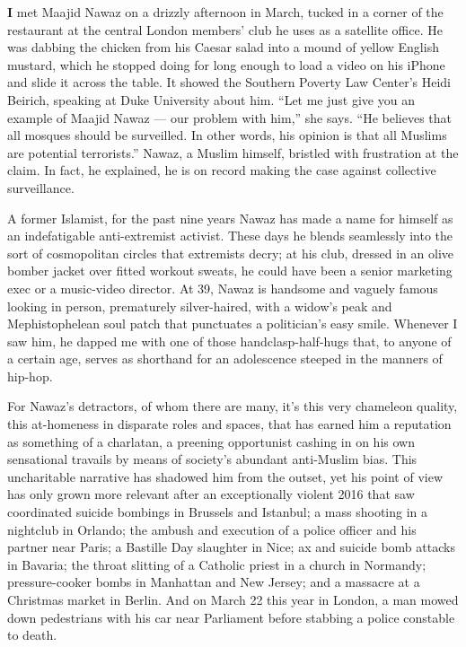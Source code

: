 \textbf{I} met Maajid Nawaz on a drizzly afternoon in March, tucked in a
corner of the restaurant at the central London members' club he uses as
a satellite office. He was dabbing the chicken from his Caesar salad
into a mound of yellow English mustard, which he stopped doing for long
enough to load a video on his iPhone and slide it across the table. It
showed the Southern Poverty Law Center's Heidi Beirich, speaking at Duke
University about him. ``Let me just give you an example of Maajid Nawaz
--- our problem with him,'' she says. ``He believes that all mosques
should be surveilled. In other words, his opinion is that all Muslims
are potential terrorists.'' Nawaz, a Muslim himself, bristled with
frustration at the claim. In fact, he explained, he is on record making
the case against collective surveillance.

A former Islamist, for the past nine years Nawaz has made a name for
himself as an indefatigable anti-extremist activist. These days he
blends seamlessly into the sort of cosmopolitan circles that extremists
decry; at his club, dressed in an olive bomber jacket over fitted
workout sweats, he could have been a senior marketing exec or a
music-video director. At 39, Nawaz is handsome and vaguely famous
looking in person, prematurely silver-haired, with a widow's peak and
Mephistophelean soul patch that punctuates a politician's easy smile.
Whenever I saw him, he dapped me with one of those handclasp-half-hugs
that, to anyone of a certain age, serves as shorthand for an adolescence
steeped in the manners of hip-hop.

For Nawaz's detractors, of whom there are many, it's this very chameleon
quality, this at-homeness in disparate roles and spaces, that has earned
him a reputation as something of a charlatan, a preening opportunist
cashing in on his own sensational travails by means of society's
abundant anti-Muslim bias. This uncharitable narrative has shadowed him
from the outset, yet his point of view has only grown more relevant
after an exceptionally violent 2016 that saw coordinated suicide
bombings in Brussels and Istanbul; a mass shooting in a nightclub in
Orlando; the ambush and execution of a police officer and his partner
near Paris; a Bastille Day slaughter in Nice; ax and suicide bomb
attacks in Bavaria; the throat slitting of a Catholic priest in a church
in Normandy; pressure-cooker bombs in Manhattan and New Jersey; and a
massacre at a Christmas market in Berlin. And on March 22 this year in
London, a man mowed down pedestrians with his car near Parliament before
stabbing a police constable to death.

